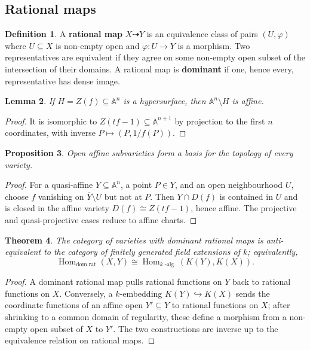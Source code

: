 \documentclass[12pt]{article}
\theoremstyle{plain}
\newtheorem{thm}{Theorem}[subsection] %
\newtheorem{proposition}[thm]{Proposition}
\newtheorem{lemma}[thm]{Lemma}
\theoremstyle{definition}
\newtheorem{defn}[thm]{Definition} %
\newcommand{\bb}[1]{\mathbb{#1}}
\DeclareMathOperator{\Hom}{Hom}
\begin{document}
\subsection{Rational maps}
\begin{defn}
A \textbf{rational map} $X\dashrightarrow Y$ is an equivalence class of pairs $(U,\varphi)$ where $U\subseteq X$ is non-empty open and $\varphi:U\to Y$ is a morphism. Two representatives are equivalent if they agree on some non-empty open subset of the intersection of their domains. A rational map is \textbf{dominant} if one, hence every, representative has dense image.
\end{defn}
\begin{lemma}\label{lem:ambient_hypersurface_affine}
If $H=Z(f)\subseteq\bb A^n$ is a hypersurface, then $\bb A^n\setminus H$ is affine.
\end{lemma}
\begin{proof}
It is isomorphic to $Z(tf-1)\subseteq\bb A^{n+1}$ by projection to the first $n$ coordinates, with inverse $P\mapsto(P,1/f(P))$.
\end{proof}
\begin{proposition}\label{prop:base}
Open affine subvarieties form a basis for the topology of every variety.
\end{proposition}
\begin{proof}
For a quasi-affine $Y\subseteq\bb A^n$, a point $P\in Y$, and an open neighbourhood $U$, choose $f$ vanishing on $\overline Y\setminus U$ but not at $P$. Then $Y\cap D(f)$ is contained in $U$ and is closed in the affine variety $D(f)\cong Z(tf-1)$, hence affine. The projective and quasi-projective cases reduce to affine charts.
\end{proof}
\begin{thm}\label{thm:equivalence_of_cats}
The category of varieties with dominant rational maps is anti-equivalent to the category of finitely generated field extensions of $k$; equivalently,
\[
\Hom_{\mathrm{dom.rat}}(X,Y)\cong\Hom_{k\operatorname{-alg}}(K(Y),K(X)).
\]
\end{thm}
\begin{proof}
A dominant rational map pulls rational functions on $Y$ back to rational functions on $X$. Conversely, a $k$-embedding $K(Y)\hookrightarrow K(X)$ sends the coordinate functions of an affine open $Y'\subseteq Y$ to rational functions on $X$; after shrinking to a common domain of regularity, these define a morphism from a non-empty open subset of $X$ to $Y'$. The two constructions are inverse up to the equivalence relation on rational maps.
\end{proof}
\end{document}
